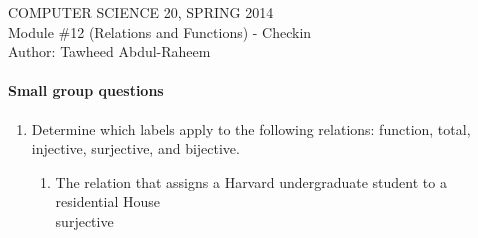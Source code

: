 \documentclass[12pt]{article}
\begin{document}
\begin{center}
\large
COMPUTER SCIENCE 20, SPRING 2014 \\
Module \#12 (Relations and Functions) - Checkin \\
Author: Tawheed Abdul-Raheem
\medskip

\end{center}
\medskip


\paragraph*{Small group questions}
\begin{enumerate}

\item Determine which labels apply to the following relations: function, total, injective, surjective, and bijective.

\begin{enumerate}
\item The relation that assigns a Harvard undergraduate student to a residential House \\
     surjective


\end{enumerate}
\end{enumerate}
\end{document}
